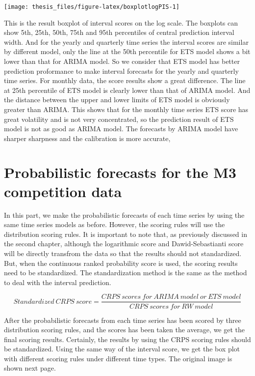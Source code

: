 \documentclass{monashthesis}
\theoremstyle{definition}
\theoremstyle{definition}
\theoremstyle{definition}
\theoremstyle{remark}
\begin{document}
\texttt{[image: thesis\_files/figure-latex/boxplotlogPIS-1]}

This is the result boxplot of interval scores on the log scale. The
boxplots can show 5th, 25th, 50th, 75th and 95th percentiles of central
prediction interval width. And for the yearly and quarterly time series
the interval scores are similar by different model, only the line at the
50th percentile for ETS model shows a bit lower than that for ARIMA
model. So we consider that ETS model has better prediction proformance
to make interval forecasts for the yearly and quarterly time series. For
monthly data, the score results show a great difference. The line at
25th percentile of ETS model is clearly lower than that of ARIMA model.
And the distance between the upper and lower limits of ETS model is
obviously greater than ARIMA. This shows that for the monthly time
series ETS score has great volatility and is not very concentrated, so
the prediction result of ETS model is not as good as ARIMA model. The
forecasts by ARIMA model have sharper sharpness and the calibration is
more accurate,

\section{Probabilistic forecasts for the M3 competition
data}\label{probabilistic-forecasts-for-the-m3-competition-data}

In this part, we make the probabilistic forecasts of each time series by
using the same time series models as before. However, the scoring rules
will use the distribution scoring rules. It is important to note that,
as previously discussed in the second chapter, although the logarithmic
score and Dawid-Sebastianti score will be directly transfrom the data so
that the results should not standardized. But, when the continuous
ranked probability score is used, the scoring results need to be
standardized. The standardization method is the same as the method to
deal with the interval prediction.

\[Standardized~CRPS~score=\frac{CRPS~scores~for~ARIMA~model~or~ETS~model}{CRPS~scores~for~RW~model}\]

After the probabilistic forecasts from each time series has been scored
by three distribution scoring rules, and the scores has been taken the
average, we get the final scoring results. Certainly, the results by
using the CRPS scoring rules should be standardized. Using the same way
of the interval score, we get the box plot with different scoring rules
under different time types. The original image is shown next page.
\end{document}
